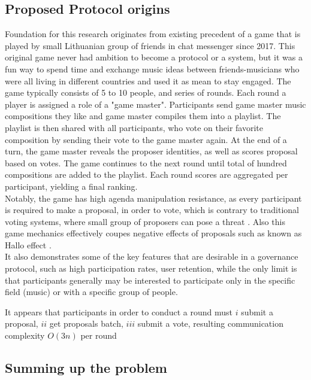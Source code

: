\documentclass{article}
\begin{document}
\begin{CJK}{UTF8}{gbsn}
\begin{multicols}{2}
\subsection{Proposed Protocol origins}\label{sec:protocol_origins}
Foundation for this research originates from existing precedent of a game that is played by small Lithuanian group of friends in chat messenger since 2017. This original game never had ambition to become a protocol or a system, but it was a fun way to spend time and exchange music ideas between friends-musicians who were all living in different countries and used it as mean to stay engaged. The game typically consists of 5 to 10 people, and series of rounds. Each round a player is assigned a role of a "game master". Participants send game master music compositions they like and game master compiles them into a playlist. The playlist is then shared with all participants, who vote on their favorite composition by sending their vote to the game master again. At the end of a turn, the game master reveals the proposer identities, as well as scores proposal based on votes. The game continues to the next round until total of hundred compositions are added to the playlist. Each round scores are aggregated per participant, yielding a final ranking.\\
Notably, the game has high agenda manipulation resistance, as every participant is required to make a proposal, in order to vote, which is contrary to traditional voting systems, where small group of proposers can pose a threat  \cite{McKelvey1976}. Also this game mechanics effectively coupes negative effects of proposals such as known as Hallo effect \cite{Verhulst2010}. \\
It also demonstrates some of the key features that are desirable in a governance protocol, such as high participation rates, user retention, while the only limit is that participants generally may be interested to participate only in the specific field (music) or with a specific group of people.

It appears that participants in order to conduct a round must \(i\) submit a proposal, \(ii\) get proposals batch, \(iii\) submit a vote, resulting communication complexity $O(3n)$ per round


\subsection{Summing up the problem}


\end{multicols}
\end{CJK}
\end{document}
